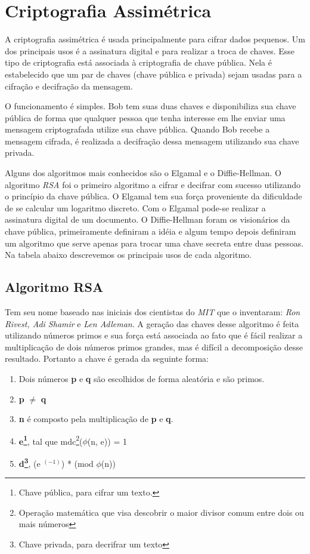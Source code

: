 %
\section{Criptografia Assimétrica}
\label{assymmetric-cryptography}

%
A criptografia assimétrica é usada principalmente para cifrar dados pequenos. Um dos principais usos é a assinatura digital e para realizar a troca de chaves. Esse tipo de criptografia está associada à criptografia de chave pública. Nela é estabelecido que um par de chaves (chave pública e privada) sejam usadas para a cifração e decifração da mensagem. 

%
O funcionamento é simples. Bob tem suas duas chaves e disponibiliza sua chave pública de forma que qualquer pessoa que tenha interesse em lhe enviar uma mensagem criptografada utilize sua chave pública. Quando Bob recebe a mensagem cifrada, é realizada a decifração dessa mensagem utilizando sua chave privada.

%
Alguns dos algoritmos mais conhecidos são o Elgamal e o Diffie-Hellman. O algoritmo \textit{RSA} foi o primeiro algoritmo a cifrar e decifrar com sucesso utilizando o princípio da chave pública. O Elgamal tem sua força proveniente da dificuldade de se calcular um logaritmo discreto. Com o Elgamal pode-se realizar a assinatura digital de um documento. O Diffie-Hellman foram os visionários da chave pública, primeiramente definiram a idéia e algum tempo depois definiram um algoritmo que serve apenas para trocar uma chave secreta entre duas pessoas.  Na tabela abaixo descrevemos os principais usos de cada algoritmo. 



\subsection{Algoritmo RSA}
\label{algorithm-rsa}

Tem seu nome baseado nas iniciais dos cientistas do \textit{MIT} que o inventaram: \textit{Ron Rivest, Adi Shamir} e \textit{Len Adleman}. A geração das chaves desse algoritmo é feita utilizando números primos e sua força está associada ao fato que é fácil realizar a multiplicação de dois números primos grandes, mas é difícil a decomposição desse resultado. Portanto a chave é gerada da seguinte forma:

\begin{enumerate}
\item Dois números \textbf{p} e \textbf{q} são escolhidos de forma aleatória e são primos.
\item \textbf{p} $\neq$ \textbf{q}
\item \textbf{n} é composto pela multiplicação de \textbf{p} e \textbf{q}.
\item \textbf{e\footnote{Chave pública, para cifrar um texto.}}, tal que mdc\footnote{Operação matemática que visa descobrir o maior divisor comum entre dois ou mais números}($\phi$(n, e)) = 1
\item \textbf{d\footnote{Chave privada, para decrifrar um texto }}, (e $^ {(-1)}$) * (mod $\phi$(n)) 
\end{enumerate}

